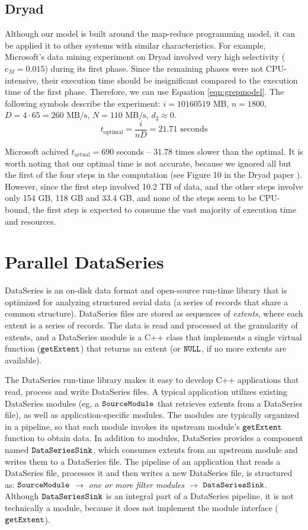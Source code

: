 \documentclass{acm_proc_article-sp}
\begin{document}
\subsection{Dryad}

Although our model is built around the map-reduce programming model, it can be
applied it to other systems with similar characteristics. For example,
Microsoft's data mining experiment on Dryad \cite{dryad} involved very high
selectivity ($e_M = 0.015$) during its first phase. Since the remaining phases
were not CPU-intensive, their execution time should be insignificant compared to
the execution time of the first phase. Therefore, we can use Equation
\ref{eqn:grepmodel}. The following symbols describe
the experiment: $i = 10160519 \text{ MB}$, $n = 1800$, $D = 4 \cdot 65 = 260
\text{ MB/s}$, $N = 110 \text{ MB/s}$, $d_2 \approx 0$. \[t_\text{optimal} = \frac{i}{n D} =
21.71 \text{ seconds}\]

Microsoft achived $t_\text{actual} = 690$ seconds -- 31.78 times slower than
the optimal. It is worth noting that our optimal time is not accurate, because
we ignored all but the first of the four steps in the computation (see Figure
10 in the Dryad paper \cite{dryad}). However, since the first step involved
10.2 TB of data, and the other steps involve only 154 GB, 118 GB and 33.4 GB,
and none of the steps seem to be CPU-bound, the first step is expected to
consume the vast majority of execution time and resources.

\section{Parallel DataSeries}

DataSeries \cite{dataseries} is an on-disk data format and open-source run-time
library that is optimized for analyzing structured serial data (a series of
records that share a common structure). DataSeries files are stored as
sequences of \emph{extents}, where each extent is a series of records.
The data is read and processed at the granularity of extents, and a DataSeries
module is a C++ class that implements a single virtual function ($\tt
getExtent$) that returns an extent (or $\tt NULL$, if no more extents
are available).

The DataSeries run-time library makes it easy to develop C++ applications that
read, process and write DataSeries files. A typical application utilizes existing
DataSeries modules (eg, a $\tt SourceModule$ that retrieves extents from a
DataSeries file), as well as application-specific modules. The modules are
typically organized in a pipeline, so that each module invokes its upstream
module's $\tt getExtent$ function to obtain data. In addition to modules,
DataSeries provides a component named $\tt DataSeriesSink$, which consumes
extents from an upstream module and writes them to a DataSeries file. The
pipeline of an application that reads a DataSeries file, processes it and then
writes a new DataSeries file, is structured as: $\tt SourceModule$ $\to$
\emph{one or more filter modules} $\to$ $\tt DataSeriesSink$. Although $\tt DataSeriesSink$
is an integral part of a DataSeries pipeline, it is not technically a module,
because it does not implement the module interface ($\tt getExtent$).
\end{document}
